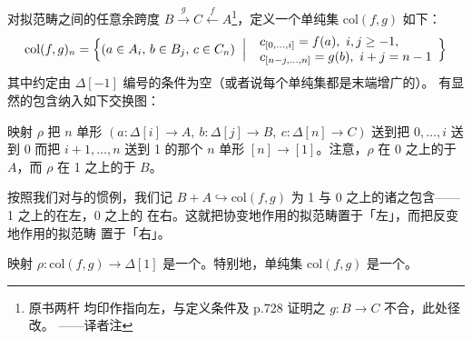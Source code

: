 \begin{definition}\label{def:quasicategorical-collage}
对拟范畴之间的任意余跨度 $B\xrightarrow{g}C\xleftarrow{f}A$\footnote{原书两杆
均印作指向左，与定义条件及 p.728 证明之 $g\colon B\to C$ 不合，此处径改。
——译者注}，定义一个单纯集
$\mathrm{col}(f,g)$ 如下：
\[
\mathrm{col}(f,g)_{n}=\Bigl\{(a\in A_{i},\,b\in B_{j},\,c\in C_{n})\;\Bigm|\;
\begin{array}{l}
c_{[0,\dotsc,i]}=f(a),\ i,j\ge -1,\\
c_{[n-j,\dotsc,n]}=g(b),\ i+j=n-1
\end{array}\Bigr\}
\]
其中约定由 $\Delta[-1]$ 编号的条件为空（或者说每个单纯集都是末端增广的）。
有显然的包含纳入如下交换图：
\begin{center}
\end{center}
映射 $\rho$ 把 $n$ 单形 $(a\colon\Delta[i]\to A,\ b\colon\Delta[j]\to B,\ c\colon\Delta[n]\to C)$
送到把 $0,\dotsc,i$ 送到 0 而把 $i+1,\dotsc,n$ 送到 1 的那个 $n$ 单形
$[n]\to[1]$。注意，$\rho$ 在 0 之上的\trFiber{}\trIsomorphism{}于 $A$，而
$\rho$ 在 1 之上的\trFiber{}\trIsomorphism{}于 $B$。
\end{definition}

按照我们对\trTwoSidedFibration{}与\trModule{}的惯例，我们记 $B+A\hookrightarrow\mathrm{col}(f,g)$
为 1 与 0 之上的诸\trFiber{}之包含——1 之上的\trFiber{}在左，0 之上的%
\trFiber{}在右。这就把协变地作用的拟范畴置于「左」，而把反变地作用的拟范畴
置于「右」。

\begin{lemma}\label{lem:collage-inner-fibration}
映射 $\rho\colon\mathrm{col}(f,g)\to\Delta[1]$ 是一个\trInnerFibration。特别地，单纯集
$\mathrm{col}(f,g)$ 是一个\trQuasiCategory。
\end{lemma}

